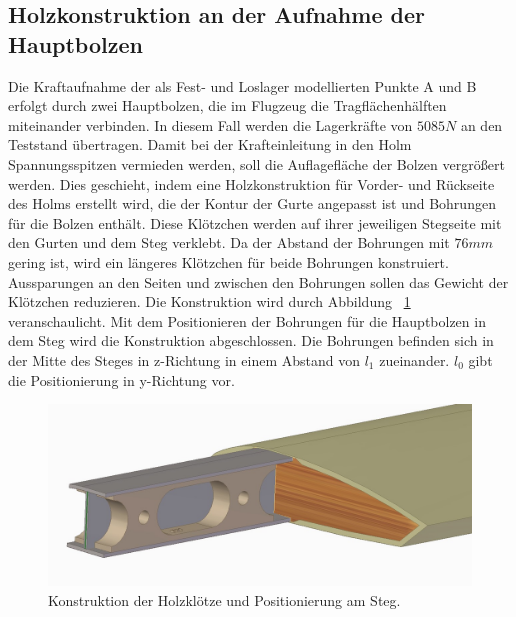 \subsection{Holzkonstruktion an der Aufnahme der Hauptbolzen}
Die Kraftaufnahme der  als Fest- und Loslager modellierten Punkte A und B erfolgt durch zwei Hauptbolzen, die im Flugzeug die Tragflächenhälften miteinander verbinden. In diesem Fall werden die Lagerkräfte von $ 5085N $ an den Teststand übertragen. Damit bei der Krafteinleitung in den Holm Spannungsspitzen vermieden werden, soll die Auflagefläche der Bolzen vergrößert werden. Dies geschieht, indem eine Holzkonstruktion für Vorder- und Rückseite des Holms erstellt wird, die der Kontur der Gurte angepasst ist und Bohrungen für die Bolzen enthält. Diese Klötzchen werden auf ihrer jeweiligen Stegseite mit den Gurten und dem Steg verklebt. Da der Abstand der Bohrungen mit $ 76mm $ gering ist, wird ein längeres Klötzchen für beide Bohrungen konstruiert. Aussparungen an den Seiten und zwischen den Bohrungen sollen das Gewicht der Klötzchen reduzieren. Die Konstruktion wird durch Abbildung ~\ref{fig: Klotz} veranschaulicht. Mit dem Positionieren der Bohrungen für die Hauptbolzen in dem Steg wird die Konstruktion abgeschlossen. Die Bohrungen befinden sich in der Mitte des Steges in z-Richtung in einem Abstand von $ l_{1} $ zueinander. $ l_{0} $ gibt die Positionierung in y-Richtung vor. 
\begin{figure}[h]
	\includegraphics[width=1.0\textwidth]{Bilder/Klotz.jpg}
	\caption{Konstruktion der Holzklötze und Positionierung am Steg.}
	\label{fig: Klotz}
\end{figure}
